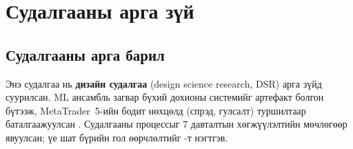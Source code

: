 \chapter{Судалгааны арга зүй}
\label{ch:methodology}

\section{Судалгааны арга барил}

Энэ судалгаа нь \textbf{дизайн судалгаа} (design science research, DSR) \cite{hevner2004} арга зүйд суурилсан. ML ансамбль загвар бүхий дохионы системийг артефакт болгон бүтээж, MetaTrader~5-ийн бодит нөхцөлд (спрэд, гулсалт) туршилтаар баталгаажуулсан \cite{peffers2007}. Судалгааны процессыг 7 давталтын хөгжүүлэлтийн мөчлөгөөр явуулсан; үе шат бүрийн гол өөрчлөлтийг -т нэгтгэв.

